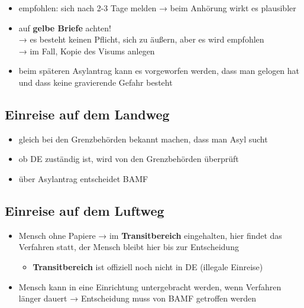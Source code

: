 \documentclass[
]{article}
\providecommand{\tightlist}{%
  \setlength{\itemsep}{0pt}\setlength{\parskip}{0pt}}
\begin{document}
\begin{itemize}
\begin{itemize}
    \begin{itemize}
    \tightlist
    \item
      empfohlen: sich nach 2-3 Tage melden → beim Anhörung wirkt es
      plausibler
    \item
      auf \textbf{gelbe Briefe} achten!\\
      → es besteht keinen Pflicht, sich zu äußern, aber es wird
      empfohlen\\
      → im Fall, Kopie des Visums anlegen
    \item
      beim späteren Asylantrag kann es vorgeworfen werden, dass man
      gelogen hat und dass keine gravierende Gefahr besteht
    \end{itemize}
  \end{itemize}
\end{itemize}

\hypertarget{einreise-auf-dem-landweg}{%
\subsection{Einreise auf dem Landweg}\label{einreise-auf-dem-landweg}}

\begin{itemize}
\tightlist
\item
  gleich bei den Grenzbehörden bekannt machen, dass man Asyl sucht
\item
  ob DE zuständig ist, wird von den Grenzbehörden überprüft
\item
  über Asylantrag entscheidet BAMF
\end{itemize}

\hypertarget{einreise-auf-dem-luftweg}{%
\subsection{Einreise auf dem Luftweg}\label{einreise-auf-dem-luftweg}}

\begin{itemize}
\tightlist
\item
  Mensch ohne Papiere → im \textbf{Transitbereich} eingehalten, hier
  findet das Verfahren statt, der Mensch bleibt hier bis zur
  Entscheidung

  \begin{itemize}
  \tightlist
  \item
    \textbf{Transitbereich} ist offiziell noch nicht in DE (illegale
    Einreise)
  \end{itemize}
\item
  Mensch kann in eine Einrichtung untergebracht werden, wenn Verfahren
  länger dauert → Entscheidung muss von BAMF getroffen werden
\end{itemize}
\end{document}
